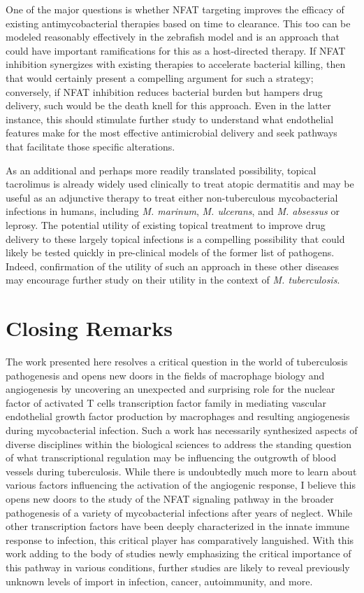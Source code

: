 One of the major questions is whether NFAT targeting improves the efficacy of existing antimycobacterial therapies based on time to clearance. This too can be modeled reasonably effectively in the zebrafish model and is an approach that could have important ramifications for this as a host\hyp{}directed therapy. If NFAT inhibition synergizes with existing therapies to accelerate bacterial killing, then that would certainly present a compelling argument for such a strategy; conversely, if NFAT inhibition reduces bacterial burden but hampers drug delivery, such would be the death knell for this approach. Even in the latter instance, this should stimulate further study to understand what endothelial features make for the most effective antimicrobial delivery and seek pathways that facilitate those specific alterations.

As an additional and perhaps more readily translated possibility, topical tacrolimus is already widely used clinically to treat atopic dermatitis and may be useful as an adjunctive therapy to treat either non\hyp{}tuberculous mycobacterial infections in humans, including \textit{M. marinum}, \textit{M. ulcerans}, and \textit{M. absessus} or leprosy. The potential utility of existing topical treatment to improve drug delivery to these largely topical infections is a compelling possibility that could likely be tested quickly in pre\hyp{}clinical models of the former list of pathogens. Indeed, confirmation of the utility of such an approach in these other diseases may encourage further study on their utility in the context of \textit{M. tuberculosis}.

\section{Closing Remarks}\label{closing}

The work presented here resolves a critical question in the world of tuberculosis pathogenesis and opens new doors in the fields of macrophage biology and angiogenesis by uncovering an unexpected and surprising role for the nuclear factor of activated T cells transcription factor family in mediating vascular endothelial growth factor production by macrophages and resulting angiogenesis during mycobacterial infection. Such a work has necessarily synthesized aspects of diverse disciplines within the biological sciences to address the standing question of what transcriptional regulation may be influencing the outgrowth of blood vessels during tuberculosis. While there is undoubtedly much more to learn about various factors influencing the activation of the angiogenic response, I believe this opens new doors to the study of the NFAT signaling pathway in the broader pathogenesis of a variety of mycobacterial infections after years of neglect. While other transcription factors have been deeply characterized in the innate immune response to infection, this critical player has comparatively languished. With this work adding to the body of studies newly emphasizing the critical importance of this pathway in various conditions, further studies are likely to reveal previously unknown levels of import in infection, cancer, autoimmunity, and more.


